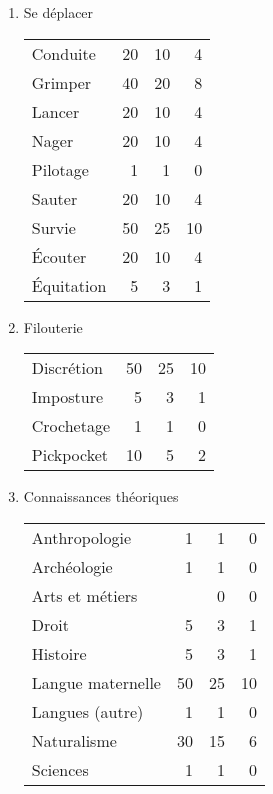 \documentclass[11pt]{article}
\begin{document}
\begin{twocols}
\begin{enumerate}
\item Se déplacer
\label{sec:org94fc199}

\begin{center}
\begin{tabular}{lrrr}
Conduite & 20 & 10 & 4\\
Grimper & 40 & 20 & 8\\
Lancer & 20 & 10 & 4\\
Nager & 20 & 10 & 4\\
Pilotage & 1 & 1 & 0\\
Sauter & 20 & 10 & 4\\
Survie & 50 & 25 & 10\\
Écouter & 20 & 10 & 4\\
Équitation & 5 & 3 & 1\\
\end{tabular}
\end{center}

\item Filouterie
\label{sec:org0080efe}

\begin{center}
\begin{tabular}{lrrr}
Discrétion & 50 & 25 & 10\\
Imposture & 5 & 3 & 1\\
Crochetage & 1 & 1 & 0\\
Pickpocket & 10 & 5 & 2\\
\end{tabular}
\end{center}

\item Connaissances théoriques
\label{sec:org3ca35e3}

\begin{center}
\begin{tabular}{lrrr}
Anthropologie & 1 & 1 & 0\\
Archéologie & 1 & 1 & 0\\
Arts et métiers &  & 0 & 0\\
Droit & 5 & 3 & 1\\
Histoire & 5 & 3 & 1\\
Langue maternelle & 50 & 25 & 10\\
Langues (autre) & 1 & 1 & 0\\
Naturalisme & 30 & 15 & 6\\
Sciences & 1 & 1 & 0\\
\end{tabular}
\end{center}


\end{enumerate}
\end{twocols}
\end{document}
